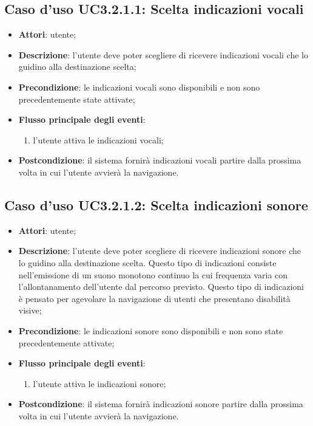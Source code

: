\documentclass[../AnalisiDeiRequisiti.tex]{subfiles}
\begin{document}
\subsection{Caso d'uso UC3.2.1.1: Scelta indicazioni vocali}
\begin{itemize}
\item \textbf{Attori}: utente;
\item \textbf{Descrizione}: l'utente deve poter scegliere di ricevere indicazioni vocali che lo guidino alla destinazione scelta; 
      \item \textbf{Precondizione}: le indicazioni vocali sono disponibili e non sono precedentemente state attivate;

        \item \textbf{Flusso principale degli eventi}:
          \begin{enumerate}
          \item l'utente attiva le indicazioni vocali;

      \end{enumerate}
    \item \textbf{Postcondizione}: il sistema fornirà indicazioni vocali partire dalla prossima volta in cui l'utente avvierà la navigazione.
  \end{itemize}
\hypertarget{UC3.2.1.2}{}
\subsection{Caso d'uso UC3.2.1.2: Scelta indicazioni sonore}
\begin{itemize}
\item \textbf{Attori}: utente;
\item \textbf{Descrizione}: l'utente deve poter scegliere di ricevere indicazioni sonore che lo guidino alla destinazione scelta. Questo tipo di indicazioni consiste nell'emissione di un suono monotono continuo la cui frequenza varia con l'allontanamento dell'utente dal percorso previsto. Questo tipo di indicazioni è pensato per agevolare la navigazione di utenti che presentano disabilità visive; 
      \item \textbf{Precondizione}: le indicazioni sonore sono disponibili e non sono state precedentemente attivate;

        \item \textbf{Flusso principale degli eventi}:
          \begin{enumerate}
          \item l'utente attiva le indicazioni sonore;
      \end{enumerate}
    \item \textbf{Postcondizione}: il sistema fornirà indicazioni sonore partire dalla prossima volta in cui l'utente avvierà la navigazione.
  \end{itemize}
\hypertarget{UC3.2.1.3}{}
\end{document}
